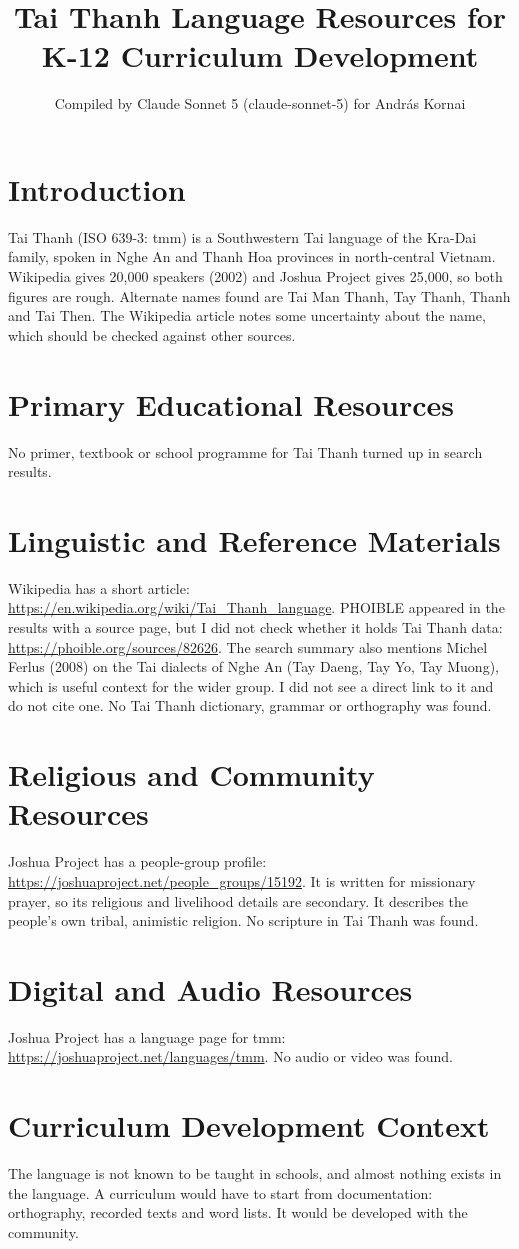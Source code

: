 \documentclass[12pt]{article}
\title{Tai Thanh Language Resources for K-12 Curriculum Development}
\author{Compiled by Claude Sonnet 5 (claude-sonnet-5) for Andr\'as Kornai}
\date{}
\begin{document}
\maketitle

\section{Introduction}
Tai Thanh (ISO 639-3: tmm) is a Southwestern Tai language of the Kra-Dai family, spoken in Nghe An and Thanh Hoa provinces in north-central Vietnam. Wikipedia gives 20,000 speakers (2002) and Joshua Project gives 25,000, so both figures are rough. Alternate names found are Tai Man Thanh, Tay Thanh, Thanh and Tai Then. The Wikipedia article notes some uncertainty about the name, which should be checked against other sources.

\section{Primary Educational Resources}
No primer, textbook or school programme for Tai Thanh turned up in search results.

\section{Linguistic and Reference Materials}
Wikipedia has a short article: \url{https://en.wikipedia.org/wiki/Tai_Thanh_language}. PHOIBLE appeared in the results with a source page, but I did not check whether it holds Tai Thanh data: \url{https://phoible.org/sources/82626}. The search summary also mentions Michel Ferlus (2008) on the Tai dialects of Nghe An (Tay Daeng, Tay Yo, Tay Muong), which is useful context for the wider group. I did not see a direct link to it and do not cite one. No Tai Thanh dictionary, grammar or orthography was found.

\section{Religious and Community Resources}
Joshua Project has a people-group profile: \url{https://joshuaproject.net/people_groups/15192}. It is written for missionary prayer, so its religious and livelihood details are secondary. It describes the people's own tribal, animistic religion. No scripture in Tai Thanh was found.

\section{Digital and Audio Resources}
Joshua Project has a language page for tmm: \url{https://joshuaproject.net/languages/tmm}. No audio or video was found.

\section{Curriculum Development Context}
The language is not known to be taught in schools, and almost nothing exists in the language. A curriculum would have to start from documentation: orthography, recorded texts and word lists. It would be developed with the community.
\end{document}
